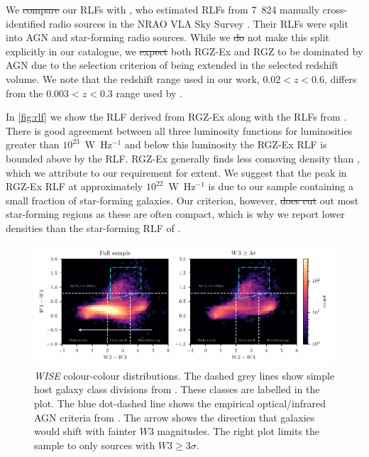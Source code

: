 \documentclass[11pt, a4paper]{book}
\providecommand{\DIFaddtex}[1]{{\protect\color{blue}\uwave{#1}}} %
\providecommand{\DIFdeltex}[1]{{\protect\color{red}\sout{#1}}}                      %
\providecommand{\DIFaddbegin}{} %
\providecommand{\DIFaddend}{} %
\providecommand{\DIFdelbegin}{} %
\providecommand{\DIFdelend}{} %
\providecommand{\DIFadd}[1]{\texorpdfstring{\DIFaddtex{#1}}{#1}} %
\providecommand{\DIFdel}[1]{\texorpdfstring{\DIFdeltex{#1}}{}} %
\newcommand{\DIFscaledelfig}{0.5}
\newlength{\DIFdelgraphicswidth} %
\newlength{\DIFdelgraphicsheight} %
\newcommand{\DIFaddincludegraphics}[2][]{{\color{blue}\fbox{\DIFOincludegraphics[#1]{#2}}}} %
\newcommand{\DIFdelincludegraphics}[2][]{%
\sbox{\DIFdelgraphicsbox}{\DIFOincludegraphics[#1]{#2}}%
\settoboxwidth{\DIFdelgraphicswidth}{\DIFdelgraphicsbox} %
\settoboxtotalheight{\DIFdelgraphicsheight}{\DIFdelgraphicsbox} %
\scalebox{\DIFscaledelfig}{%
\parbox[b]{\DIFdelgraphicswidth}{\usebox{\DIFdelgraphicsbox}\\[-\baselineskip] \rule{\DIFdelgraphicswidth}{0em}}\llap{\resizebox{\DIFdelgraphicswidth}{\DIFdelgraphicsheight}{%
\setlength{\unitlength}{\DIFdelgraphicswidth}%
\begin{picture}(1,1)%
\thicklines\linethickness{2pt} %
{\color[rgb]{1,0,0}\put(0,0){\framebox(1,1){}}}%
{\color[rgb]{1,0,0}\put(0,0){\line( 1,1){1}}}%
{\color[rgb]{1,0,0}\put(0,1){\line(1,-1){1}}}%
\end{picture}%
}\hspace*{3pt}}} %
} %
\DeclareRobustCommand{\DIFaddbegin}{\DIFOaddbegin \let\includegraphics\DIFaddincludegraphics} %
\DeclareRobustCommand{\DIFaddend}{\DIFOaddend \let\includegraphics\DIFOincludegraphics} %
\DeclareRobustCommand{\DIFdelbegin}{\DIFOdelbegin \let\includegraphics\DIFdelincludegraphics} %
\DeclareRobustCommand{\DIFdelend}{\DIFOaddend \let\includegraphics\DIFOincludegraphics} %
\begin{document}
  We \DIFdelbegin \DIFdel{compare }\DIFdelend \DIFaddbegin \DIFadd{compared }\DIFaddend our RLFs with \citet{mauch07rlf}, who estimated RLFs from 7~824
  manually cross-identified radio sources in the NRAO VLA Sky Survey \citep[NVSS;][]{condon98nvss}.
  Their RLFs were split into AGN and star-forming radio sources. While we
  \DIFdelbegin \DIFdel{do }\DIFdelend \DIFaddbegin \DIFadd{did }\DIFaddend not make this split explicitly in our catalogue, we \DIFdelbegin \DIFdel{expect }\DIFdelend \DIFaddbegin \DIFadd{expected }\DIFaddend both RGZ-Ex
  and RGZ to be dominated by AGN due to the selection criterion of being extended in the selected redshift volume. We note that the redshift range used in our work, $0.02 < z < 0.6$, differs from the $0.003 < z < 0.3$ range used by \citet{mauch07rlf}.

  In \autoref{fig:rlf} we show the RLF derived from RGZ-Ex along with the RLFs from \citet{mauch07rlf}. There is good
  agreement between all three luminosity functions for luminosities greater than $10^{23}$~W~Hz$^{-1}$
  and below this luminosity the RGZ-Ex RLF is bounded above by the
  \citet{mauch07rlf} RLF. RGZ-Ex generally finds less comoving density than \citet{mauch07rlf}, which we attribute to our requirement for extent. We suggest that the peak in RGZ-Ex RLF at approximately $10^{22}$~W~Hz$^{-1}$ is due to our sample containing a small fraction of star-forming galaxies. Our criterion, however, \DIFdelbegin \DIFdel{does cut }\DIFdelend \DIFaddbegin \DIFadd{cuts }\DIFaddend out most star-forming regions as these are often compact, which is why we report lower densities than the star-forming RLF of \citet{mauch07rlf}.

\begin{figure}
    \centering
    \includegraphics[width=\linewidth]{rlf-images/colour-colour.pdf}
    \caption[\emph{WISE} colour-colour distributions.]{\emph{WISE} colour-colour distributions. The dashed grey lines show
      simple host galaxy class divisions from \citet{jarrett17wise}. These
      classes are labelled in the plot. The blue dot-dashed line shows
      the empirical optical/infrared AGN criteria from \citet{jarrett11wise}. The arrow shows the direction that galaxies would shift with fainter $W3$ magnitudes. The right plot limits the sample to only sources with $W3 \geq 3 \sigma$.
      \label{fig:colour-colour}}
  \end{figure}
\end{document}
